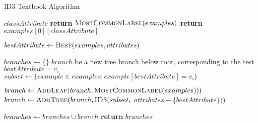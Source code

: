 \begin{algorithm}[H]
\caption{ID3 Textbook Algorithm}\label{a:id3-simple}
\begin{algorithmic}[1]
\renewcommand{\algorithmicrequire}{\textbf{Global Vars:}}
\Require $classAttribute$
          \State \textbf{return} $\textsc{MostCommonLabel}(examples)$
        \State \textbf{return} $examples[0][classAttribute]$
    \EndIf


    \State $bestAttribute \gets \textsc{Best}(examples, attributes)$

    \State $branches \gets \{\}$
         $branch$ {\small be a new tree branch below root, corresponding to the test} $bestAttribute = v_i$
        \State $subset \gets \{example \in examples : example[bestAttribute] = v_i\}$

            \State $branch \gets \textsc{AddLeaf}(branch, \textsc{MostCommonLabel}(examples)))$
        \Else
            \State $branch \gets \textsc{AddTree}(branch, \textsc{ID3}(subset,$ $attributes - \{bestAttribute\}))$\par\hfill {}
        \EndIf
        \State $branches \gets branches \cup branch$
    \EndFor
    \State \textbf{return} $branches$
\EndProcedure
\end{algorithmic}
\end{algorithm}

